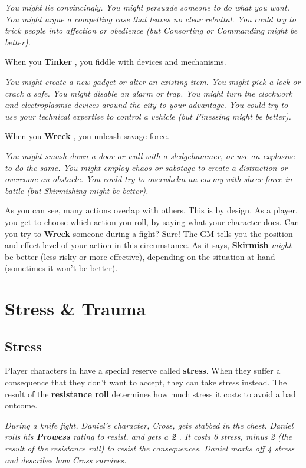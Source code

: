 \documentclass[11pt,fleqn,a5paper]{book}
\newcommand{\gameterm}[1]{\textbf{#1}}
\begin{document}
\emph{You might lie convincingly. You might persuade someone to do what you want. You might argue a compelling case that leaves no clear rebuttal. You could try to trick people into affection or obedience (but Consorting or Commanding might be better).}

When you \gameterm{Tinker} , you fiddle with devices and mechanisms.

\emph{You might create a new gadget or alter an existing item. You might pick a lock or crack a safe. You might disable an alarm or trap. You might turn the clockwork and electroplasmic devices around the city to your advantage. You could try to use your technical expertise to control a vehicle (but Finessing might be better).}

When you \gameterm{Wreck} , you unleash savage force.

\emph{You might smash down a door or wall with a sledgehammer, or use an explosive to do the same. You might employ chaos or sabotage to create a distraction or overcome an obstacle. You could try to overwhelm an enemy with sheer force in battle (but Skirmishing might be better).}

As you can see, many actions overlap with others. This is by design. As a player, you get to choose which action you roll, by saying what your character does. Can you try to \gameterm{Wreck}  someone during a fight? Sure! The GM tells you the position and effect level of your action in this circumstance. As it says, \gameterm{Skirmish}  \emph{might} be better (less risky or more effective), depending on the situation at hand (sometimes it won’t be better).

\chapter{Stress \& Trauma}

\section{Stress}

Player characters in \thetitle{} have a special reserve called \textbf{stress}. When they suffer a consequence that they don’t want to accept, they can take stress instead. The result of the \textbf{resistance roll} determines how much stress it costs to avoid a bad outcome.

\emph{During a knife fight, Daniel’s character, Cross, gets stabbed in the chest. Daniel rolls his \gameterm{Prowess}  rating to resist, and gets a \gameterm{2} . It costs 6 stress, minus 2 (the result of the resistance roll) to resist the consequences. Daniel marks off 4 stress and describes how Cross survives.}
\end{document}
